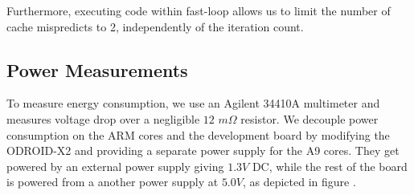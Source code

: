 Furthermore, executing code within fast-loop allows us to limit the number of
cache mispredicts to 2, independently of the iteration count.


\subsection{Power Measurements}
To measure energy consumption, we use an Agilent 34410A multimeter and measures
voltage drop over a negligible $12$ $m\Omega$ resistor. We decouple power
consumption on the ARM cores and the development board by modifying the
ODROID-X2 and providing a separate power supply for the A9 cores. They get
powered by an external power supply giving $1.3V$ DC, while the rest of the
board is powered from a another power supply at $5.0V$, as depicted in figure
.

